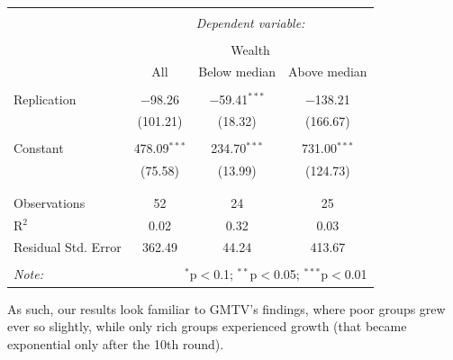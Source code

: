 \documentclass[
  authoryear,
  preprint,
  3p]{elsarticle}
\begin{document}
\begin{table}[!htbp] \centering 
  \caption{} 
  \label{} 
\begin{tabular}{@{\extracolsep{5pt}}lccc} 
\\[-1.8ex]\hline 
\hline \\[-1.8ex] 
 & \multicolumn{3}{c}{\textit{Dependent variable:}} \\ 
\cline{2-4} 
\\[-1.8ex] & \multicolumn{3}{c}{Wealth} \\ 
 & All & Below median & Above median \\ 
\hline \\[-1.8ex] 
 Replication & $-$98.26 & $-$59.41$^{***}$ & $-$138.21 \\ 
  & (101.21) & (18.32) & (166.67) \\ 
  & & & \\ 
 Constant & 478.09$^{***}$ & 234.70$^{***}$ & 731.00$^{***}$ \\ 
  & (75.58) & (13.99) & (124.73) \\ 
  & & & \\ 
\hline \\[-1.8ex] 
Observations & 52 & 24 & 25 \\ 
R$^{2}$ & 0.02 & 0.32 & 0.03 \\ 
Residual Std. Error & 362.49 & 44.24 & 413.67 \\ 
\hline 
\hline \\[-1.8ex] 
\textit{Note:}  & \multicolumn{3}{r}{$^{*}$p$<$0.1; $^{**}$p$<$0.05; $^{***}$p$<$0.01} \\ 
\end{tabular} 
\end{table}

As such, our results look familiar to GMTV's findings, where poor groups
grew ever so slightly, while only rich groups experienced growth (that
became exponential only after the 10th round).


  
\end{document}
